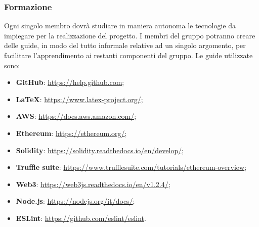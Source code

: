    		\subsubsection{Formazione}
   			Ogni singolo membro dovrà studiare in maniera autonoma le tecnologie da impiegare per la realizzazione del progetto. I membri del gruppo potranno creare delle guide, in modo del tutto informale relative ad un singolo argomento, per facilitare l'apprendimento ai restanti componenti del gruppo.
   			Le guide utilizzate sono:
   			\begin{itemize}
   				\item \textbf{GitHub\glos}: \href{https://help.github.com}{https://help.github.com};
   				\item \textbf{\LaTeX}: \href{https://www.latex-project.org/}{https://www.latex-project.org/};
   				\item \textbf{AWS}: \href{https://docs.aws.amazon.com/}{https://docs.aws.amazon.com/};
   				\item \textbf{Ethereum\glos}: \href{https://ethereum.org/}{https://ethereum.org/};
   				\item \textbf{Solidity}: \href{https://solidity.readthedocs.io/en/develop/}{https://solidity.readthedocs.io/en/develop/};
   				\item \textbf{ Truffle suite}: \href{https://www.trufflesuite.com/tutorials/ethereum-overview}{https://www.trufflesuite.com/tutorials/ethereum-overview};
   				\item \textbf{Web3}: \href{https://web3js.readthedocs.io/en/v1.2.4/}{https://web3js.readthedocs.io/en/v1.2.4/};
   				\item \textbf{Node.js}: \href{https://nodejs.org/it/docs/}{https://nodejs.org/it/docs/};
   				\item \textbf{ESLint}: \href{https://github.com/eslint/eslint}{https://github.com/eslint/eslint}.
   			\end{itemize}
